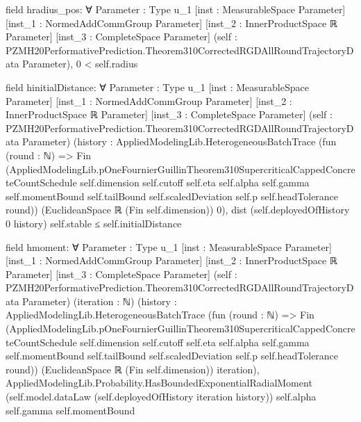 \documentclass[10pt]{article}
\begin{document}
\begin{ReviewVerbatim}
field hradius_pos:
∀ {Parameter : Type u_1} [inst : MeasurableSpace Parameter] [inst_1 : NormedAddCommGroup Parameter]
  [inst_2 : InnerProductSpace ℝ Parameter] [inst_3 : CompleteSpace Parameter]
  (self : PZMH20PerformativePrediction.Theorem310CorrectedRGDAllRoundTrajectoryData Parameter), 0 < self.radius

field hinitialDistance:
∀ {Parameter : Type u_1} [inst : MeasurableSpace Parameter] [inst_1 : NormedAddCommGroup Parameter]
  [inst_2 : InnerProductSpace ℝ Parameter] [inst_3 : CompleteSpace Parameter]
  (self : PZMH20PerformativePrediction.Theorem310CorrectedRGDAllRoundTrajectoryData Parameter)
  (history :
    AppliedModelingLib.HeterogeneousBatchTrace
      (fun (round : ℕ) =>
        Fin
          (AppliedModelingLib.pOneFournierGuillinTheorem310SupercriticalCappedConcreteCountSchedule self.dimension
            self.cutoff self.eta self.alpha self.gamma self.momentBound self.tailBound self.scaledDeviation self.p
            self.headTolerance round))
      (EuclideanSpace ℝ (Fin self.dimension)) 0),
  dist (self.deployedOfHistory 0 history) self.stable ≤ self.initialDistance

field hmoment:
∀ {Parameter : Type u_1} [inst : MeasurableSpace Parameter] [inst_1 : NormedAddCommGroup Parameter]
  [inst_2 : InnerProductSpace ℝ Parameter] [inst_3 : CompleteSpace Parameter]
  (self : PZMH20PerformativePrediction.Theorem310CorrectedRGDAllRoundTrajectoryData Parameter) (iteration : ℕ)
  (history :
    AppliedModelingLib.HeterogeneousBatchTrace
      (fun (round : ℕ) =>
        Fin
          (AppliedModelingLib.pOneFournierGuillinTheorem310SupercriticalCappedConcreteCountSchedule self.dimension
            self.cutoff self.eta self.alpha self.gamma self.momentBound self.tailBound self.scaledDeviation self.p
            self.headTolerance round))
      (EuclideanSpace ℝ (Fin self.dimension)) iteration),
  AppliedModelingLib.Probability.HasBoundedExponentialRadialMoment
    (self.model.dataLaw (self.deployedOfHistory iteration history)) self.alpha self.gamma self.momentBound


\end{ReviewVerbatim}
\end{document}
